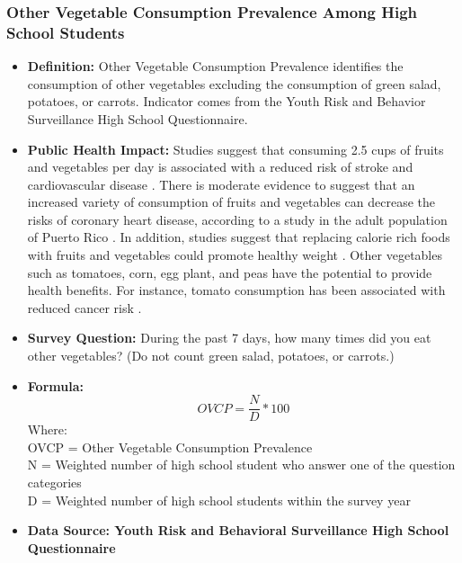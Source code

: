 \documentclass[12pt,letterpaper]{report}
\begin{document}
		\subsubsection{Other Vegetable Consumption Prevalence Among High School Students} 
	\begin{itemize}
		\item \textbf{Definition:} Other Vegetable Consumption Prevalence identifies the consumption of other vegetables excluding the consumption of green salad, potatoes, or carrots.  Indicator comes from the Youth Risk and Behavior Surveillance High School Questionnaire.
		\item \textbf{Public Health Impact:} Studies suggest that consuming 2.5 cups of fruits and vegetables per day is associated with a reduced risk of stroke \cite{he2006fruit} and cardiovascular disease \cite{bazzano2002fruit}. There is moderate evidence to suggest that an increased variety of consumption of fruits and vegetables can decrease the risks of coronary heart disease, according to a study in the adult population of Puerto Rico \cite{bhupathiraju2011greater}. In addition, studies suggest that replacing calorie rich foods with fruits and vegetables could promote healthy weight \cite{rolls2004can}. Other vegetables such as tomatoes, corn, egg plant, and peas have the potential to provide health benefits. For instance, tomato consumption has been associated with reduced cancer risk \cite{giovannucci1999tomatoes}. 

		\item \textbf{Survey Question:} During the past 7 days, how many times did you eat other vegetables? (Do not count green salad, potatoes, or carrots.)

		\item \textbf{Formula:} 
			\begin{equation}
			OVCP = \frac{N}{D} *100
			\end{equation}
Where: \\
			OVCP = Other Vegetable Consumption Prevalence\\
			
			N = Weighted number of high school student who answer one of the question categories\\
			
			D = Weighted number of high school students within the survey year \\
			
		\item \textbf{Data Source: Youth Risk and Behavioral Surveillance High School Questionnaire}
	\end{itemize}
\end{document}
